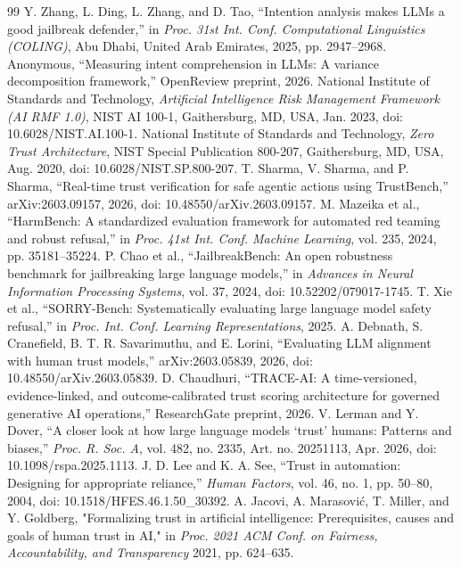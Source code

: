 \documentclass[conference]{IEEEtran}
\begin{document}
\begin{thebibliography}{99}
 Y. Zhang, L. Ding, L. Zhang, and D. Tao, ``Intention analysis makes LLMs a good jailbreak defender,'' in \textit{Proc. 31st Int. Conf. Computational Linguistics (COLING)}, Abu Dhabi, United Arab Emirates, 2025, pp. 2947–2968.
 Anonymous, ``Measuring intent comprehension in LLMs: A variance decomposition framework,'' OpenReview preprint, 2026.
 National Institute of Standards and Technology, \textit{Artificial Intelligence Risk Management Framework (AI RMF 1.0)}, NIST AI 100-1, Gaithersburg, MD, USA, Jan. 2023, doi: 10.6028/NIST.AI.100-1.
 National Institute of Standards and Technology, \textit{Zero Trust Architecture}, NIST Special Publication 800-207, Gaithersburg, MD, USA, Aug. 2020, doi: 10.6028/NIST.SP.800-207.
 T. Sharma, V. Sharma, and P. Sharma, ``Real-time trust verification for safe agentic actions using TrustBench,'' arXiv:2603.09157, 2026, doi: 10.48550/arXiv.2603.09157.
 M. Mazeika et al., ``HarmBench: A standardized evaluation framework for automated red teaming and robust refusal,'' in \textit{Proc. 41st Int. Conf. Machine Learning}, vol. 235, 2024, pp. 35181–35224.
 P. Chao et al., ``JailbreakBench: An open robustness benchmark for jailbreaking large language models,'' in \textit{Advances in Neural Information Processing Systems}, vol. 37, 2024, doi: 10.52202/079017-1745.
 T. Xie et al., ``SORRY-Bench: Systematically evaluating large language model safety refusal,'' in \textit{Proc. Int. Conf. Learning Representations}, 2025.
 A. Debnath, S. Cranefield, B. T. R. Savarimuthu, and E. Lorini, ``Evaluating LLM alignment with human trust models,'' arXiv:2603.05839, 2026, doi: 10.48550/arXiv.2603.05839.
 D. Chaudhuri, ``TRACE-AI: A time-versioned, evidence-linked, and outcome-calibrated trust scoring architecture for governed generative AI operations,'' ResearchGate preprint, 2026.
 V. Lerman and Y. Dover, ``A closer look at how large language models ‘trust’ humans: Patterns and biases,'' \textit{Proc. R. Soc. A}, vol. 482, no. 2335, Art. no. 20251113, Apr. 2026, doi: 10.1098/rspa.2025.1113.
 J. D. Lee and K. A. See, ``Trust in automation: Designing for appropriate reliance,'' \textit{Human Factors}, vol. 46, no. 1, pp. 50–80, 2004, doi: 10.1518/HFES.46.1.50\_30392.
 A. Jacovi, A. Marasović, T. Miller, and Y. Goldberg, "Formalizing trust in artificial intelligence: Prerequisites, causes and goals of human trust in AI," in \textit{ Proc. 2021 ACM Conf. on Fairness, Accountability, and Transparency} 2021, pp. 624–635.

\end{thebibliography}
\end{document}
